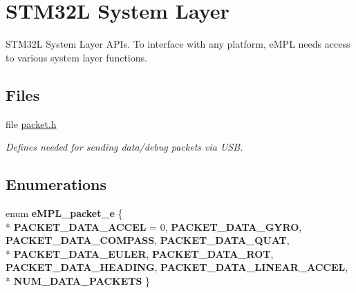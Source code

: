 \hypertarget{group___s_t_m32_l}{}\section{S\+T\+M32\+L System Layer}
\label{group___s_t_m32_l}


S\+T\+M32\+L System Layer A\+P\+Is. To interface with any platform, e\+M\+P\+L needs access to various system layer functions.  


\subsection*{Files}
\begin{DoxyCompactItemize}
\item 
file \hyperlink{packet_8h}{packet.\+h}
\begin{DoxyCompactList}\small\item\em Defines needed for sending data/debug packets via U\+S\+B. \end{DoxyCompactList}\end{DoxyCompactItemize}
\subsection*{Enumerations}
\begin{DoxyCompactItemize}
\item 
\hypertarget{group___s_t_m32_l_gad0b5944db008f1821019adc6e0807e15}{}enum {\bfseries e\+M\+P\+L\+\_\+packet\+\_\+e} \{ \\*
{\bfseries P\+A\+C\+K\+E\+T\+\_\+\+D\+A\+T\+A\+\_\+\+A\+C\+C\+E\+L} = 0, 
{\bfseries P\+A\+C\+K\+E\+T\+\_\+\+D\+A\+T\+A\+\_\+\+G\+Y\+R\+O}, 
{\bfseries P\+A\+C\+K\+E\+T\+\_\+\+D\+A\+T\+A\+\_\+\+C\+O\+M\+P\+A\+S\+S}, 
{\bfseries P\+A\+C\+K\+E\+T\+\_\+\+D\+A\+T\+A\+\_\+\+Q\+U\+A\+T}, 
\\*
{\bfseries P\+A\+C\+K\+E\+T\+\_\+\+D\+A\+T\+A\+\_\+\+E\+U\+L\+E\+R}, 
{\bfseries P\+A\+C\+K\+E\+T\+\_\+\+D\+A\+T\+A\+\_\+\+R\+O\+T}, 
{\bfseries P\+A\+C\+K\+E\+T\+\_\+\+D\+A\+T\+A\+\_\+\+H\+E\+A\+D\+I\+N\+G}, 
{\bfseries P\+A\+C\+K\+E\+T\+\_\+\+D\+A\+T\+A\+\_\+\+L\+I\+N\+E\+A\+R\+\_\+\+A\+C\+C\+E\+L}, 
\\*
{\bfseries N\+U\+M\+\_\+\+D\+A\+T\+A\+\_\+\+P\+A\+C\+K\+E\+T\+S}
 \}\label{group___s_t_m32_l_gad0b5944db008f1821019adc6e0807e15}

\end{DoxyCompactItemize}
